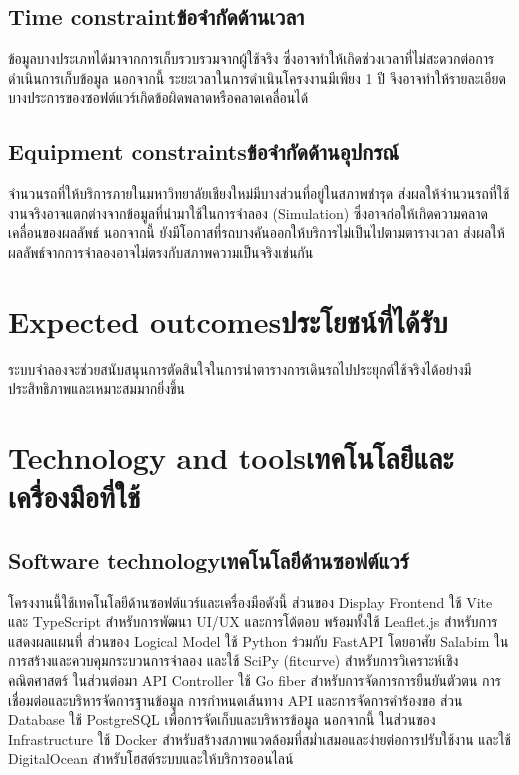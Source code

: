 \subsection{\ifenglish Time constraint\else ข้อจำกัดด้านเวลา\fi}
    \begin{mypara}
        \indent ข้อมูลบางประเภทได้มาจากการเก็บรวบรวมจากผู้ใช้จริง ซึ่งอาจทำให้เกิดช่วงเวลาที่ไม่สะดวกต่อการดำเนินการเก็บข้อมูล 
        นอกจากนี้ ระยะเวลาในการดำเนินโครงงานมีเพียง 1 ปี จึงอาจทำให้รายละเอียดบางประการของซอฟต์แวร์เกิดข้อผิดพลาดหรือคลาดเคลื่อนได้
    \end{mypara}
\subsection{\ifenglish Equipment constraints\else ข้อจำกัดด้านอุปกรณ์\fi}
    \begin{mypara}
        \indent จำนวนรถที่ให้บริการภายในมหาวิทยาลัยเชียงใหม่มีบางส่วนที่อยู่ในสภาพชำรุด 
        ส่งผลให้จำนวนรถที่ใช้งานจริงอาจแตกต่างจากข้อมูลที่นำมาใช้ในการจำลอง (Simulation) 
        ซึ่งอาจก่อให้เกิดความคลาดเคลื่อนของผลลัพธ์ นอกจากนี้ ยังมีโอกาสที่รถบางคันออกให้บริการไม่เป็นไปตามตารางเวลา 
        ส่งผลให้ผลลัพธ์จากการจำลองอาจไม่ตรงกับสภาพความเป็นจริงเช่นกัน
    \end{mypara}

\section{\ifenglish Expected outcomes\else ประโยชน์ที่ได้รับ\fi}
    \begin{mypara}
        \indent ระบบจำลองจะช่วยสนับสนุนการตัดสินใจในการนำตารางการเดินรถไปประยุกต์ใช้จริงได้อย่างมีประสิทธิภาพและเหมาะสมมากยิ่งขึ้น
    \end{mypara}
\section{\ifenglish Technology and tools\else เทคโนโลยีและเครื่องมือที่ใช้\fi}

\subsection{\ifenglish Software technology\else เทคโนโลยีด้านซอฟต์แวร์\fi}
    \begin{mypara}
        \indent โครงงานนี้ใช้เทคโนโลยีด้านซอฟต์แวร์และเครื่องมือดังนี้ ส่วนของ Display Frontend ใช้ Vite และ TypeScript 
        สำหรับการพัฒนา UI/UX และการโต้ตอบ พร้อมทั้งใช้ Leaflet.js สำหรับการแสดงผลแผนที่ ส่วนของ Logical Model 
        ใช้ Python ร่วมกับ FastAPI โดยอาศัย Salabim ในการสร้างและควบคุมกระบวนการจำลอง และใช้ SciPy (fitcurve) 
        สำหรับการวิเคราะห์เชิงคณิตศาสตร์ ในส่วนต่อมา API Controller ใช้ Go fiber สำหรับการจัดการการยืนยันตัวตน 
        การเชื่อมต่อและบริหารจัดการฐานข้อมูล การกำหนดเส้นทาง API และการจัดการคำร้องขอ 
        ส่วน Database ใช้ PostgreSQL เพื่อการจัดเก็บและบริหารข้อมูล นอกจากนี้ ในส่วนของ 
        Infrastructure ใช้ Docker สำหรับสร้างสภาพแวดล้อมที่สม่ำเสมอและง่ายต่อการปรับใช้งาน และใช้ DigitalOcean 
        สำหรับโฮสต์ระบบและให้บริการออนไลน์
    \end{mypara}


